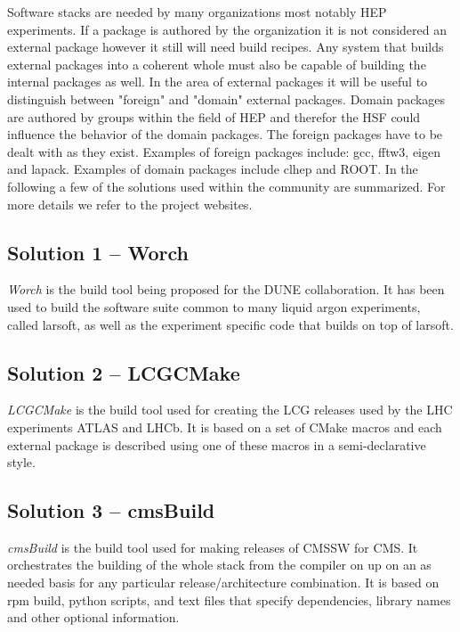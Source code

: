 \documentclass[12pt,a4paper]{article}
\begin{document}
Software stacks are needed by many organizations most notably HEP experiments.  If a package is authored by the organization it is not considered an external package however it still will need build recipes. Any system that builds external packages into a coherent whole must also be capable of building the internal packages as well.  In the area of external packages it will be useful to distinguish between "foreign" and "domain" external packages. Domain packages are authored by groups within the field of HEP and therefor the HSF could influence the behavior of the domain packages. The foreign packages have to be dealt with as they exist. Examples of foreign packages include: gcc, fftw3, eigen and lapack. Examples of domain packages include clhep and ROOT. In the following a few of the solutions used within the community are summarized. For more details we refer to the project websites. 

\subsection{Solution 1 -- Worch}
\emph{Worch}\cite{worch} is the build tool being proposed for the DUNE collaboration.  It has been used to build the software suite common to many liquid argon experiments, called larsoft, as well as the experiment specific code that builds on top of larsoft.

\subsection{Solution 2 -- LCGCMake}

\emph{LCGCMake}\cite{lcgcmake} is the build tool used for creating the LCG releases used by the LHC experiments ATLAS and LHCb. It is based on a set of CMake macros and each external package is described using one of these macros in a semi-declarative style. 

\subsection{Solution 3 -- cmsBuild} 

\emph{cmsBuild}\cite{cmsbuild} is the build tool used for making releases of CMSSW for CMS.  It orchestrates the building of the whole stack from the compiler on up on an as needed basis for any particular release/architecture combination.  It is based on rpm build, python scripts, and text files that specify dependencies, library names and other optional information.
\end{document}
